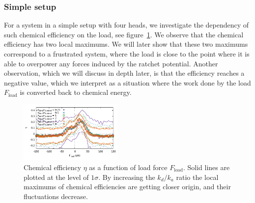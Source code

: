 \documentclass[aps,pre,twocolumn,showpacs,showkeys,superscriptaddress,floatfix]{revtex4-1}
\begin{document}
\subsubsection{Simple setup}
For a system in a simple setup with four heads, we investigate the dependency of such chemical efficiency on the load, see figure~\ref{fig:chem}.
We observe that the chemical efficiency has two local maximums. 
We will later show that these two maximums correspond to a frustrated system, 
where the load is close to the point where it is able to overpower any forces induced by the ratchet potential. 
Another observation, which we will discuss in depth later, is that the efficiency reaches a negative value, 
which we interpret as a situation where the work done by the load $F_\text{load}$ is converted back to chemical energy. 
\begin{figure}[t]
\centering
\includegraphics[width=0.45\textwidth,height=!]{chemical_cycle}
\caption{
\label{fig:chem}
Chemical efficiency $\eta$ as a function of load force $F_\text{load}$.
Solid lines are plotted at the level of $1\sigma$. 
By increasing the $k_d/k_a$ ratio the local maximums of chemical efficiencies are getting closer origin,
and their fluctuations decrease. 
}
\end{figure}
\end{document}
